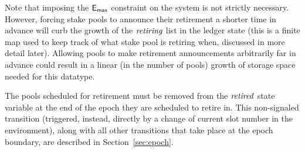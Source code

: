 Note that imposing the $\mathsf{E_{max}}$ constraint on the system is not strictly necessary.
However, forcing stake pools to announce their retirement a shorter time in
advance will curb the growth of the $\mathit{retiring}$ list in the ledger state
(this is a finite map used to keep track of what stake pool is retiring when,
discussed in more detail later).
Allowing pools to make retirement announcements arbitrarily far in advance
could result in a linear (in the number of pools) growth of storage space needed
for this datatype.

The pools scheduled for retirement must be removed from
the $\mathit{retired}$ state variable at the end of the epoch they are scheduled
to retire in. This non-signaled transition (triggered, instead, directly by a
change of current slot number in the environment), along with all other transitions
that take place at the epoch boundary, are described in Section~\ref{sec:epoch}.


